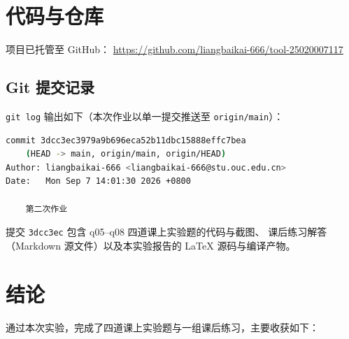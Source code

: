 \documentclass[a4paper,11pt]{ctexart}
\begin{document}
\section{代码与仓库}

项目已托管至 GitHub：
\url{https://github.com/liangbaikai-666/tool-25020007117}

\subsection{Git 提交记录}

\texttt{git log} 输出如下（本次作业以单一提交推送至 \texttt{origin/main}）：

\begin{lstlisting}[language=bash, numbers=none]
commit 3dcc3ec3979a9b696eca52b11dbc15888effc7bea
    (HEAD -> main, origin/main, origin/HEAD)
Author: liangbaikai-666 <liangbaikai-666@stu.ouc.edu.cn>
Date:   Mon Sep 7 14:01:30 2026 +0800

    第二次作业
\end{lstlisting}

提交 \texttt{3dcc3ec} 包含 q05--q08 四道课上实验题的代码与截图、
课后练习解答（Markdown 源文件）以及本实验报告的
\LaTeX{} 源码与编译产物。

\section{结论}

通过本次实验，完成了四道课上实验题与一组课后练习，主要收获如下：
\end{document}
